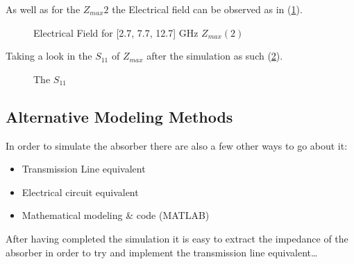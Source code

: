         As well as for the $Z_{max}2$ the Electrical field can be observed as in (\ref{img:E_Zmax2}).
        \begin{figure}[h]
            \centering
             \hfil
             \hfil

            \caption{Electrical Field for [2.7, 7.7, 12.7] GHz $Z_{max}(2)$}
            \label{img:E_Zmax2}
        \end{figure}


        Taking a look in the $S_{11}$ of $Z_{max}$ after the simulation as such (\ref{plt:S11_Zmax}).
        \begin{figure}[h]
            \centering
            \caption{\textsf{The $S_{11}$}}
            \label{plt:S11_Zmax}
        \end{figure}


    \subsection{\textsf{Alternative Modeling Methods}}
        In order to simulate the absorber there are also a few other ways to go about it:
        \begin{itemize}
            \item Transmission Line equivalent
            \item Electrical circuit equivalent
            \item Mathematical modeling \& code (MATLAB)
        \end{itemize}
        
        After having completed the simulation it is easy to extract the impedance of the
        absorber in order to try and implement the transmission line equivalent\dots